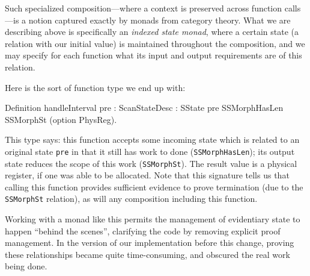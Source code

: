 \documentclass{llncs}
\begin{document}
Such specialized composition---where a context is preserved across function
calls---is a notion captured exactly by monads from category theory.  What we
are describing above is specifically an \emph{indexed state monad}, where a
certain state (a relation with our initial value) is maintained throughout the
composition, and we may specify for each function what its input and output
requirements are of this relation.

Here is the sort of function type we end up with:

\begin{coq_example*}
Definition handleInterval {pre : ScanStateDesc}
  : SState pre SSMorphHasLen SSMorphSt (option PhysReg).
\end{coq_example*}






This type says: this function accepts some incoming state which is related to
an original state \texttt{pre} in that it still has work to done
(\texttt{SSMorphHasLen}); its output state reduces the scope of this work
(\texttt{SSMorphSt}).  The result value is a physical register, if one was
able to be allocated.  Note that this signature tells us that calling this
function provides sufficient evidence to prove termination (due to the
\texttt{SSMorphSt} relation), as will any composition including this function.

Working with a monad like this permits the management of evidentiary state to
happen ``behind the scenes'', clarifying the code by removing explicit proof
management.  In the version of our implementation before this change, proving
these relationships became quite time-consuming, and obscured the real work
being done.
\end{document}
